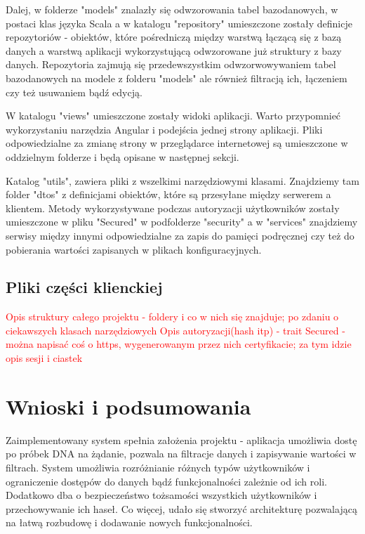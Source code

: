 \documentclass[a4paper,12pt,twoside]{article}
\begin{document}
Dalej, w folderze "models" znalazły się odwzorowania tabel bazodanowych,
w postaci klas języka Scala a w katalogu "repository" umieszczone 
zostały definicje repozytoriów - obiektów, które pośredniczą
między warstwą łączącą się z bazą danych a warstwą aplikacji 
wykorzystującą odwzorowane już struktury z bazy danych.
Repozytoria zajmują się przedewszystkim odwzorwowywaniem tabel bazodanowych na 
modele z folderu "models" ale również filtracją ich, łączeniem
czy też usuwaniem bądź edycją.

W katalogu "views" umieszczone zostały widoki aplikacji. 
Warto przypomnieć wykorzystaniu narzędzia Angular 
i podejścia jednej strony aplikacji. Pliki odpowiedzialne 
za zmianę strony w przeglądarce internetowej są umieszczone 
w oddzielnym folderze i będą opisane w następnej sekcji.

Katalog "utils", zawiera pliki z wszelkimi narzędziowymi
klasami. Znajdziemy tam folder "dtos" z definicjami obiektów,
które są przesyłane między serwerem a klientem.
Metody wykorzystywane podczas autoryzacji użytkowników zostały umieszczone w pliku "Secured" w podfolderze "security" a w "services" znajdziemy 
serwisy między innymi odpowiedzialne za zapis do pamięci podręcznej czy też
do pobierania wartości zapisanych w plikach konfiguracyjnych.
 
\newpage
\subsection{Pliki części klienckiej}

\textcolor{red}{
Opis struktury całego projektu - foldery i co w nich się znajduje;
po zdaniu o ciekawszych klasach narzędziowych
\newline
Opis autoryzacji(hash itp) - trait Secured - można napisać coś o https, wygenerowanym przez nich certyfikacie;
za tym idzie opis sesji i ciastek
}
\newpage
\section{Wnioski i podsumowania}  

Zaimplementowany system spełnia założenia projektu - aplikacja
umożliwia dostę po próbek DNA na żądanie, pozwala na filtracje danych
i zapisywanie wartości w filtrach. 
System umożliwia rozróżnianie różnych typów użytkowników 
i ograniczenie dostępów do danych bądź funkcjonalności zależnie od ich
roli.
Dodatkowo dba o bezpieczeństwo
tożsamości wszystkich użytkowników i przechowywanie ich haseł.
Co więcej, udało się stworzyć
architekturę pozwalającą na łatwą rozbudowę 
i dodawanie nowych funkcjonalności. 
\end{document}
